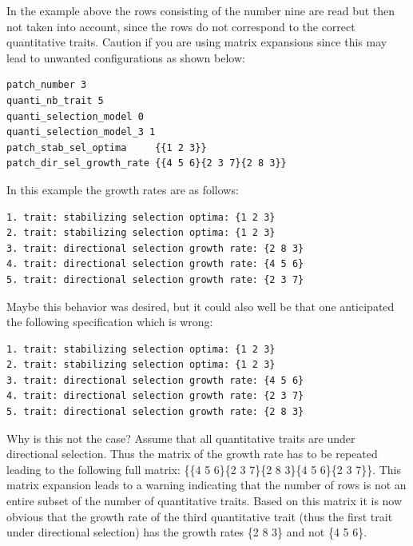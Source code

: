 \documentclass[letterpaper,12pt,oneside]{book}
\begin{document}
\begin{appendices}
\begin{lstlisting}[frame=single]
\end{lstlisting}
In the example above the rows consisting of the number nine are read but then not taken into account, since the rows do not correspond to the correct quantitative traits. Caution if you are using matrix expansions since this may lead to unwanted configurations as shown below:
\begin{lstlisting}[frame=single]
patch_number 3
quanti_nb_trait 5 
quanti_selection_model 0    
quanti_selection_model_3 1
patch_stab_sel_optima     {{1 2 3}}
patch_dir_sel_growth_rate {{4 5 6}{2 3 7}{2 8 3}}
\end{lstlisting}
In this example the growth rates are as follows:
\begin{lstlisting}[frame=single]
1. trait: stabilizing selection optima: {1 2 3}
2. trait: stabilizing selection optima: {1 2 3}
3. trait: directional selection growth rate: {2 8 3}
4. trait: directional selection growth rate: {4 5 6}
5. trait: directional selection growth rate: {2 3 7}
\end{lstlisting}
Maybe this behavior was desired, but it could also well be that one anticipated the following specification which is wrong:
\begin{lstlisting}[frame=single]
1. trait: stabilizing selection optima: {1 2 3}
2. trait: stabilizing selection optima: {1 2 3}
3. trait: directional selection growth rate: {4 5 6}
4. trait: directional selection growth rate: {2 3 7}
5. trait: directional selection growth rate: {2 8 3}
\end{lstlisting}
Why is this not the case? Assume that all quantitative traits are under directional selection. Thus the matrix of the growth rate has to be repeated leading to the following full matrix: \{\{4 5 6\}\{2 3 7\}\{2 8 3\}\{4 5 6\}\{2 3 7\}\}. This matrix expansion leads to a warning indicating that the number of rows is not an entire subset of the number of quantitative traits. Based on this matrix it is now obvious that the growth rate of the third quantitative trait (thus the first trait under directional selection) has the growth rates \{2 8 3\} and not \{4 5 6\}.



\end{appendices}
\end{document}
